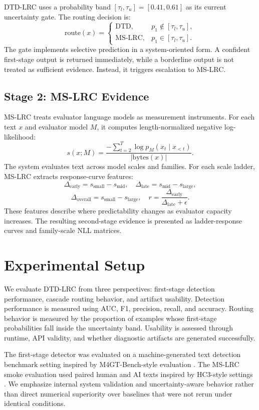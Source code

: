 \documentclass[11pt]{article}
\begin{document}
DTD-LRC uses a probability band $[\tau_l, \tau_u] = [0.41, 0.61]$ as its current uncertainty gate. The routing decision is:
\[
\mathrm{route}(x)=
\begin{cases}
\mathrm{DTD}, & p_1 \notin [\tau_l,\tau_u],\\
\mathrm{MS\mbox{-}LRC}, & p_1 \in [\tau_l,\tau_u].
\end{cases}
\]
The gate implements selective prediction in a system-oriented form. A confident first-stage output is returned immediately, while a borderline output is not treated as sufficient evidence. Instead, it triggers escalation to MS-LRC.

\subsection{Stage 2: MS-LRC Evidence}

MS-LRC treats evaluator language models as measurement instruments. For each text $x$ and evaluator model $M$, it computes length-normalized negative log-likelihood:
\[
s(x;M)=\frac{-\sum_{t=2}^{T}\log p_M(x_t\mid x_{<t})}{|\mathrm{bytes}(x)|}.
\]
The system evaluates text across model scales and families. For each scale ladder, MS-LRC extracts response-curve features:
\[
\Delta_{\mathrm{early}}=s_{\mathrm{small}}-s_{\mathrm{mid}}, \quad
\Delta_{\mathrm{late}}=s_{\mathrm{mid}}-s_{\mathrm{large}},
\]
\[
\Delta_{\mathrm{overall}}=s_{\mathrm{small}}-s_{\mathrm{large}}, \quad
r=\frac{\Delta_{\mathrm{early}}}{\Delta_{\mathrm{late}}+\epsilon}.
\]
These features describe where predictability changes as evaluator capacity increases. The resulting second-stage evidence is presented as ladder-response curves and family-scale NLL matrices.

\section{Experimental Setup}

We evaluate DTD-LRC from three perspectives: first-stage detection performance, cascade routing behavior, and artifact usability. Detection performance is measured using AUC, F1, precision, recall, and accuracy. Routing behavior is measured by the proportion of examples whose first-stage probabilities fall inside the uncertainty band. Usability is assessed through runtime, API validity, and whether diagnostic artifacts are generated successfully.

The first-stage detector was evaluated on a machine-generated text detection benchmark setting inspired by M4GT-Bench-style evaluation \cite{wang2024m4gtbench}. The MS-LRC smoke evaluation used paired human and AI texts inspired by HC3-style settings \cite{guo2023hc3}. We emphasize internal system validation and uncertainty-aware behavior rather than direct numerical superiority over baselines that were not rerun under identical conditions.
\end{document}
